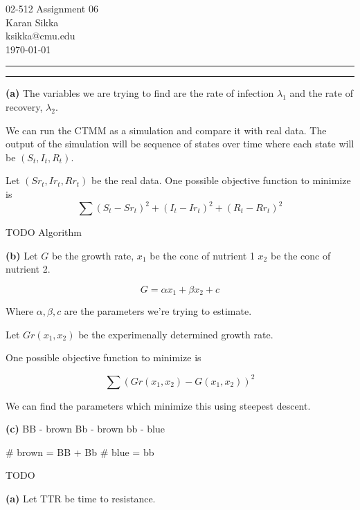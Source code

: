 \documentclass[11pt,letterpaper]{article}
\makeatletter
\newcommand{\question}[1] {\vspace{.25in} \hrule\vspace{0.5em}
\noindent{\bf #1} \vspace{0.5em}
\hrule \vspace{.10in}}
\renewcommand{\part}[1] {\vspace{.10in} {\bf (#1)}}
\newcommand{\myname}{Karan Sikka}
\newcommand{\myandrew}{ksikka@cmu.edu}
\newcommand{\myhwnum}{06}
\makeatother
\begin{document}
\medskip

\thispagestyle{plain}
\begin{center}                  %
{\Large 02-512 Assignment \myhwnum} \\
\myname \\
\myandrew \\
\today
\end{center}

\question{1}
\part{a}
The variables we are trying to find are 
the rate of infection $\lambda_1$
and the rate of recovery, $\lambda_2$.

We can run the CTMM as a simulation
and compare it with real data.
The output of the simulation will be sequence of states over time
where each state will be $(S_t,I_t,R_t)$.

Let $(Sr_t, Ir_t, Rr_t)$ be the real data.
One possible objective function to minimize is 
$$ \sum (S_t - Sr_t)^2 + (I_t - Ir_t)^2 + (R_t - Rr_t)^2 $$

TODO Algorithm

\part{b}
Let $G$ be the growth rate,
$x_1$ be the conc of nutrient 1
$x_2$ be the conc of nutrient 2.

$$G = \alpha x_1 + \beta x_2 + c$$

Where $\alpha, \beta, c$ are the parameters we're trying to estimate.

Let $Gr(x_1,x_2)$ be the experimenally determined growth rate.

One possible objective function to minimize is

$$ \sum (Gr(x_1, x_2) - G(x_1, x_2))^2 $$

We can find the parameters which minimize this using
steepest descent.

\part{c}
BB - brown
Bb - brown
bb - blue

# brown = BB + Bb
# blue = bb

TODO

\part{a}
Let TTR be time to resistance.
\end{document}
